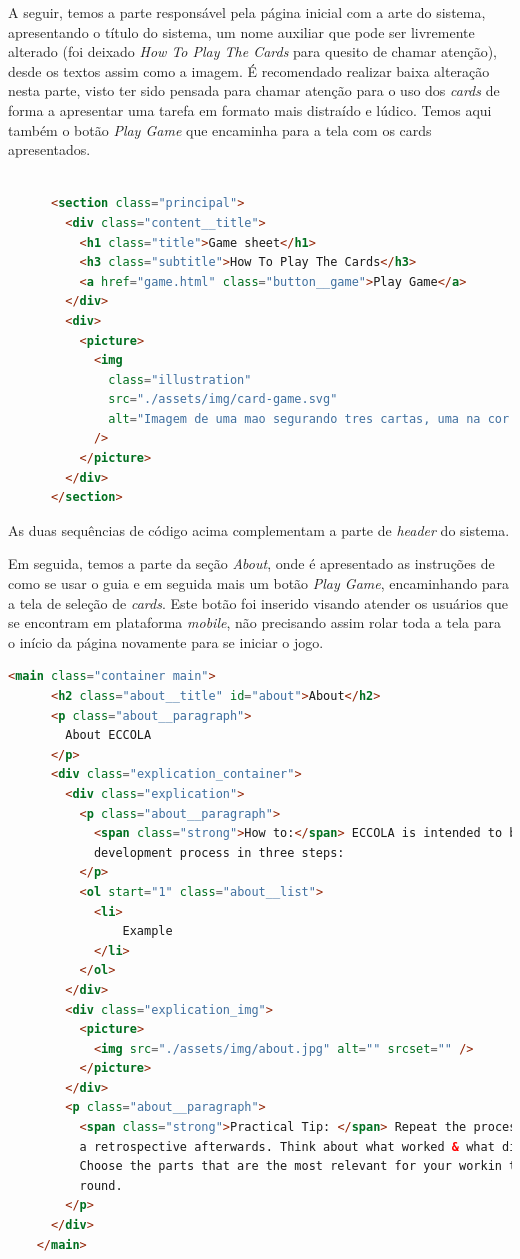 A seguir, temos a parte responsável pela página inicial com a arte do sistema, apresentando o título do sistema, um nome auxiliar que pode ser livremente alterado (foi deixado \textit{How To Play The Cards} para quesito de chamar atenção), desde os textos assim como a imagem. É recomendado realizar baixa alteração nesta parte, visto ter sido pensada para chamar atenção para o uso dos \textit{cards} de forma a apresentar uma tarefa em formato mais distraído e lúdico. Temos aqui também o botão \textit{Play Game} que encaminha para a tela com os cards apresentados.

\begin{lstlisting}[language=html, caption=Seção principal]

      <section class="principal">
        <div class="content__title">
          <h1 class="title">Game sheet</h1>
          <h3 class="subtitle">How To Play The Cards</h3>
          <a href="game.html" class="button__game">Play Game</a>
        </div>
        <div>
          <picture>
            <img
              class="illustration"
              src="./assets/img/card-game.svg"
              alt="Imagem de uma mao segurando tres cartas, uma na cor azul escuro, laranja e azul claro"
            />
          </picture>
        </div>
      </section>

\end{lstlisting}

As duas sequências de código acima complementam a parte de \textit{header} do sistema.

Em seguida, temos a parte da seção \textit{About}, onde é apresentado as instruções de como se usar o guia e em seguida mais um botão \textit{Play Game}, encaminhando para a tela de seleção de \textit{cards}. Este botão foi inserido visando atender os usuários que se encontram em plataforma \textit{mobile}, não precisando assim rolar toda a tela para o início da página novamente para se iniciar o jogo.

\begin{lstlisting}[language=html, caption=Código apresentando o about e como usar o guia.]
<main class="container main">
      <h2 class="about__title" id="about">About</h2>
      <p class="about__paragraph">
        About ECCOLA
      </p>
      <div class="explication_container">
        <div class="explication">
          <p class="about__paragraph">
            <span class="strong">How to:</span> ECCOLA is intended to be used during the entire design and
            development process in three steps:
          </p>
          <ol start="1" class="about__list">
            <li>
                Example
            </li>
          </ol>
        </div>
        <div class="explication_img">
          <picture>
            <img src="./assets/img/about.jpg" alt="" srcset="" />
          </picture>
        </div>
        <p class="about__paragraph">
          <span class="strong">Practical Tip: </span> Repeat the process in every iteration. Remember to do
          a retrospective afterwards. Think about what worked & what did not.
          Choose the parts that are the most relevant for your workin the next
          round.
        </p>
      </div>
    </main>
\end{lstlisting}

